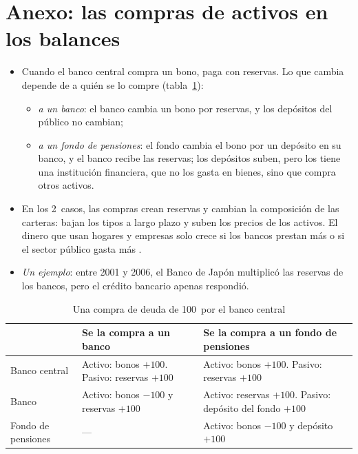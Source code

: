 \documentclass[11pt]{article}
\begin{document}
\section{Anexo: las compras de activos en los balances}\label{anexo:compras-activos}

\begin{itemize}
\item Cuando el banco central compra un bono, paga con reservas. Lo que cambia depende de a quién se lo compre (tabla~\ref{tab:compras-activos}):
  \begin{itemize}
  \item \emph{a un banco}: el banco cambia un bono por reservas, y los depósitos del público no cambian;
  \item \emph{a un fondo de pensiones}: el fondo cambia el bono por un depósito en su banco, y el banco recibe las reservas; los depósitos suben, pero los tiene una institución financiera, que no los gasta en bienes, sino que compra otros activos.
  \end{itemize}
\item En los 2~casos, las compras crean reservas y cambian la composición de las carteras: bajan los tipos a largo plazo y suben los precios de los activos. El dinero que usan hogares y empresas solo crece si los bancos prestan más o si el sector público gasta más .
\item \emph{Un ejemplo}: entre 2001 y 2006, el Banco de Japón multiplicó las reservas de los bancos, pero el crédito bancario apenas respondió\nocite{BowmanEtAl2015Quantitative}.
\end{itemize}

\begin{table}[H]
\centering
\caption{Una compra de deuda de 100~por el banco central}\label{tab:compras-activos}
\small
\begin{tabular}{>{\raggedright\arraybackslash}p{}>{\raggedright\arraybackslash}p{}>{\raggedright\arraybackslash}p{}}
\toprule
\rowcolor{tceeazulpalido} & \textbf{Se la compra a un banco} & \textbf{Se la compra a un fondo de pensiones} \\
\midrule
Banco central & Activo: bonos $+100$. Pasivo: reservas $+100$ & Activo: bonos $+100$. Pasivo: reservas $+100$ \\
Banco & Activo: bonos $-100$ y reservas $+100$ & Activo: reservas $+100$. Pasivo: depósito del fondo $+100$ \\
Fondo de pensiones & — & Activo: bonos $-100$ y depósito $+100$ \\
\bottomrule
\end{tabular}
\end{table}
\end{document}
